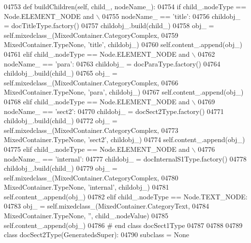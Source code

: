 \begin{DoxyCode}
{{{{{{{{{{{{{{{{{{{{{{{{{{{{{{{{{{{{{{{{{{{{{{{{{{{{{{{{{{{{{{{{{{{{{{{{{{{{{{{{{{{{{{{{{{{{{{{{{{{{{{{{{{{{{{{{{{{{{{{{{{{{{{{{{{{{{{{{{{{{{{{{{{{{{{{{{{{{{{{{{{{{{{{{{{{{{{{{{{{{{{{{{{{{{{{{{{{{{{{{{{{{{{{{{{{{{{{{{{{{{{{{{{{{{{{{{{{{{{{{{{{{{{{{{{{{{{{{{{{{{{{{{{{{{{{{{{{{{{{{{{{{{{{{{{{{{{{{{{{{{{{{{{{{{{{{{{{{{{{{{{{{04753     \textcolor{keyword}{def }buildChildren(self, child\_, nodeName\_):
04754         \textcolor{keywordflow}{if} child\_.nodeType == Node.ELEMENT\_NODE \textcolor{keywordflow}{and} \(\backslash\)
04755             nodeName\_ == \textcolor{stringliteral}{'title'}:
04756             childobj\_ = docTitleType.factory()
04757             childobj\_.build(child\_)
04758             obj\_ = self.mixedclass_(MixedContainer.CategoryComplex,
04759                 MixedContainer.TypeNone, \textcolor{stringliteral}{'title'}, childobj\_)
04760             self.content\_.append(obj\_)
04761         \textcolor{keywordflow}{elif} child\_.nodeType == Node.ELEMENT\_NODE \textcolor{keywordflow}{and} \(\backslash\)
04762             nodeName\_ == \textcolor{stringliteral}{'para'}:
04763             childobj\_ = docParaType.factory()
04764             childobj\_.build(child\_)
04765             obj\_ = self.mixedclass_(MixedContainer.CategoryComplex,
04766                 MixedContainer.TypeNone, \textcolor{stringliteral}{'para'}, childobj\_)
04767             self.content\_.append(obj\_)
04768         \textcolor{keywordflow}{elif} child\_.nodeType == Node.ELEMENT\_NODE \textcolor{keywordflow}{and} \(\backslash\)
04769             nodeName\_ == \textcolor{stringliteral}{'sect2'}:
04770             childobj\_ = docSect2Type.factory()
04771             childobj\_.build(child\_)
04772             obj\_ = self.mixedclass_(MixedContainer.CategoryComplex,
04773                 MixedContainer.TypeNone, \textcolor{stringliteral}{'sect2'}, childobj\_)
04774             self.content\_.append(obj\_)
04775         \textcolor{keywordflow}{elif} child\_.nodeType == Node.ELEMENT\_NODE \textcolor{keywordflow}{and} \(\backslash\)
04776             nodeName\_ == \textcolor{stringliteral}{'internal'}:
04777             childobj\_ = docInternalS1Type.factory()
04778             childobj\_.build(child\_)
04779             obj\_ = self.mixedclass_(MixedContainer.CategoryComplex,
04780                 MixedContainer.TypeNone, \textcolor{stringliteral}{'internal'}, childobj\_)
04781             self.content\_.append(obj\_)
04782         \textcolor{keywordflow}{elif} child\_.nodeType == Node.TEXT\_NODE:
04783             obj\_ = self.mixedclass_(MixedContainer.CategoryText,
04784                 MixedContainer.TypeNone, \textcolor{stringliteral}{''}, child\_.nodeValue)
04785             self.content\_.append(obj\_)
04786 \textcolor{comment}{# end class docSect1Type}
04787 
04788 
04789 \textcolor{keyword}{class }docSect2Type(GeneratedsSuper):
04790     subclass = \textcolor{keywordtype}{None}
}}}}}}}}}}}}}}}}}}}}}}}}}}}}}}}}}}}}}}}}}}}}}}}}}}}}}}}}}}}}}}}}}}}}}}}}}}}}}}}}}}}}}}}}}}}}}}}}}}}}}}}}}}}}}}}}}}}}}}}}}}}}}}}}}}}}}}}}}}}}}}}}}}}}}}}}}}}}}}}}}}}}}}}}}}}}}}}}}}}}}}}}}}}}}}}}}}}}}}}}}}}}}}}}}}}}}}}}}}}}}}}}}}}}}}}}}}}}}}}}}}}}}}}}}}}}}}}}}}}}}}}}}}}}}}}}}}}}}}}}}}}}}}}}}}}}}}}}}}}}}}}}}}}}}}}}}}}}}}}}}}}}
\end{DoxyCode}
